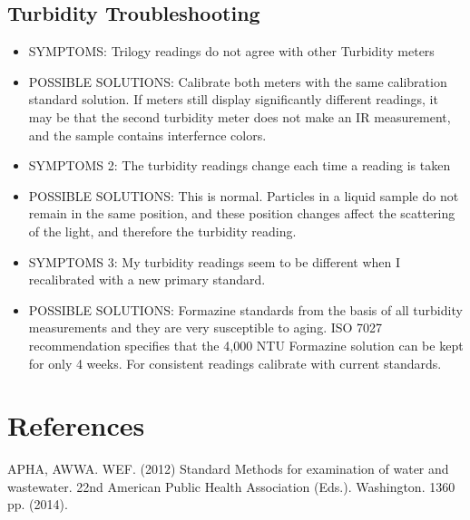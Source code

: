 \documentclass[12pt]{../SOP3_beta}\usepackage[]{graphicx}\usepackage[]{color}
\begin{document}
\subsection{Turbidity Troubleshooting}
\begin{itemize}
  \item SYMPTOMS: Trilogy readings do not agree with other Turbidity meters
  \item POSSIBLE SOLUTIONS: Calibrate both meters with the same calibration standard solution. If meters still display significantly different readings, it may be that the second turbidity meter does not make an IR measurement, and the sample contains interfernce colors. 
  \item SYMPTOMS 2: The turbidity readings change each time a reading is taken
  \item POSSIBLE SOLUTIONS: This is normal. Particles in a liquid sample do not remain in the same position, and these position changes affect the scattering of the light, and therefore the turbidity reading. 
  \item SYMPTOMS 3: My turbidity readings seem to be different when I recalibrated with a new primary standard.
  \item POSSIBLE SOLUTIONS: Formazine standards from the basis of all turbidity measurements and they are very susceptible to aging. ISO 7027 recommendation specifies that the 4,000 NTU Formazine solution can be kept for only 4 weeks. For consistent readings calibrate with current standards. 
\end{itemize}

\section{References}

\NP APHA, AWWA. WEF. (2012) Standard Methods for examination of water and wastewater. 22nd American Public Health Association (Eds.). Washington. 1360 pp. (2014).
\end{document}
